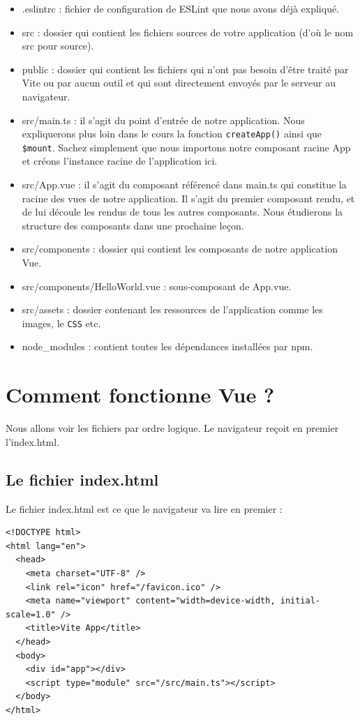 \begin{itemize}
\item  {\color{blue} .eslintrc}  : fichier de configuration de {\color{monOrange} ESLint} que nous avons déjà expliqué.
\item  {\color{blue} src } : dossier qui contient les fichiers sources de votre application (d'où le nom {\color{monOrange} src} pour source).
\item  {\color{blue} public}  : dossier qui contient les fichiers qui n'ont pas besoin d'être traité par {\color{monOrange} Vite} ou par aucun outil et qui sont directement envoyés par le serveur au navigateur.
\item  {\color{blue} src/main.ts}  : il s'agit du point d'entrée de notre application. Nous expliquerons plus loin dans le cours la fonction {\tt createApp()} ainsi que {\tt \$mount}. Sachez simplement que nous importons notre composant racine {\color{monOrange} App} et créons l'instance racine de l'application ici.
\item  {\color{blue} src/App.vue}  : il s'agit du composant référencé dans {\color{monOrange} main.ts} qui constitue la racine des vues de notre application. Il s'agit du premier composant rendu, et de lui découle les rendus de tous les autres composants. Nous étudierons la structure des composants dans une prochaine leçon.
\item  {\color{blue} src/components}  : dossier qui contient les composants de notre application {\color{monOrange} Vue}.
\item  {\color{blue} src/components/HelloWorld.vue}  : sous-composant de {\color{monOrange} App.vue}.
\item  {\color{blue} src/assets}  : dossier contenant les ressources de l'application comme les images, le {\tt CSS} etc.
\item  {\color{blue} node\_modules}  : contient toutes les dépendances installées par {\color{monOrange} npm}.
\end{itemize}



\section{Comment fonctionne Vue ?}
Nous allons voir les fichiers par ordre logique. Le navigateur reçoit en premier l'{\color{monOrange}index.html}.

\subsection{Le fichier {\color{monOrange}index.html}}
Le fichier index.html est ce que le navigateur va lire en premier :
\begin{verbatim}
<!DOCTYPE html>
<html lang="en">
  <head>
    <meta charset="UTF-8" />
    <link rel="icon" href="/favicon.ico" />
    <meta name="viewport" content="width=device-width, initial-scale=1.0" />
    <title>Vite App</title>
  </head>
  <body>
    <div id="app"></div>
    <script type="module" src="/src/main.ts"></script>
  </body>
</html>
\end{verbatim} 


